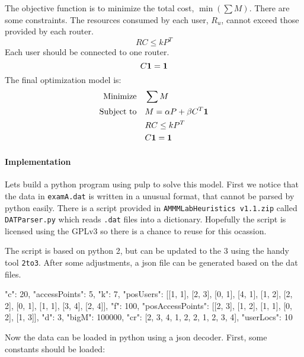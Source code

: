 \documentclass[11pt,a4paper]{article}
\newcommand*\mat[1]{ \begin{pmatrix} #1 \end{pmatrix}}
\begin{document}
The objective function is to minimize the total cost, $\min(\sum M)$.
There are some constraints. The resources consumed by each user, $R_u$, cannot 
exceed those provided by each router.
%
$$ RC \le k P^T $$
%
Each user should be connected to one router.
%
$$ C \bf{1} = \bf{1} $$
%
The final optimization model is:
%
\begin{align}
\text{Minimize} \quad & \sum M\\
\text{Subject to}	\quad & M = \alpha P + \beta C^T \bf{1} \\
& RC \le k P^T \\
& C \bf{1} = \bf{1}
\end{align}

\paragraph*{Implementation}
Lets build a python program using pulp to solve this model. First we notice that 
the data in {\tt examA.dat} is written in a unusual format, that cannot be 
parsed by python easily. There is a script provided in {\tt AMMMLabHeuristics 
v1.1.zip} called {\tt DATParser.py} which reads {\tt .dat} files into a 
dictionary. Hopefully the script is licensed using the GPLv3 so there is a 
chance to reuse for this ocassion.

The script is based on python 2, but can be updated to the 3 using the handy 
tool {\tt 2to3}. After some adjustments, a json file can be generated based on 
the dat files.
%
\begin{textcode}
{"c": 20, "accessPoints": 5, "k": 7, "posUsers": [[1, 1], [2, 3], [0, 1], [4, 
1], [1, 2], [2, 2], [0, 1], [1, 1], [3, 4], [2, 4]], "f": 100, 
"posAccessPoints": [[2, 3], [1, 2], [1, 1], [0, 2], [1, 3]], "d": 3, "bigM": 
100000, "cr": [2, 3, 4, 1, 2, 2, 1, 2, 3, 4], "userLocs": 10}
\end{textcode}
%
Now the data can be loaded in python using a json decoder. First, some constants 
should be loaded:
\end{document}
